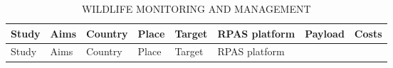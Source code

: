 \documentclass[]{interact}
\theoremstyle{plain}%
\theoremstyle{definition}
\theoremstyle{remark}
\begin{document}
\begin{longtable}[]{@{}llllllll@{}}
\caption{WILDLIFE MONITORING AND MANAGEMENT}\tabularnewline
\toprule
\begin{minipage}[b]{0.11\columnwidth}\raggedright\strut
Study\strut
\end{minipage} & \begin{minipage}[b]{0.18\columnwidth}\raggedright\strut
Aims\strut
\end{minipage} & \begin{minipage}[b]{0.03\columnwidth}\raggedright\strut
Country\strut
\end{minipage} & \begin{minipage}[b]{0.14\columnwidth}\raggedright\strut
Place\strut
\end{minipage} & \begin{minipage}[b]{0.10\columnwidth}\raggedright\strut
Target\strut
\end{minipage} & \begin{minipage}[b]{0.09\columnwidth}\raggedright\strut
RPAS platform\strut
\end{minipage} & \begin{minipage}[b]{0.11\columnwidth}\raggedright\strut
Payload\strut
\end{minipage} & \begin{minipage}[b]{0.01\columnwidth}\raggedright\strut
Costs\strut
\end{minipage}\tabularnewline
\midrule
\endfirsthead
\toprule
\begin{minipage}[b]{0.11\columnwidth}\raggedright\strut
Study\strut
\end{minipage} & \begin{minipage}[b]{0.18\columnwidth}\raggedright\strut
Aims\strut
\end{minipage} & \begin{minipage}[b]{0.03\columnwidth}\raggedright\strut
Country\strut
\end{minipage} & \begin{minipage}[b]{0.14\columnwidth}\raggedright\strut
Place\strut
\end{minipage} & \begin{minipage}[b]{0.10\columnwidth}\raggedright\strut
Target\strut
\end{minipage} & \begin{minipage}[b]{0.09\columnwidth}\raggedright\strut
RPAS platform\strut
\end{minipage} & \begin{minipage}[b]{0.11\columnwidth}\raggedright\strut

\end{minipage}
\end{longtable}
\end{document}
